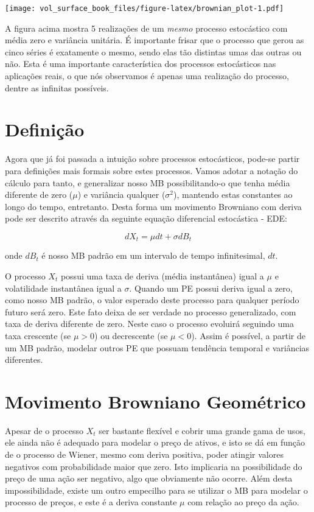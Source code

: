 \documentclass[]{book}
\begin{document}
\texttt{[image: vol\_surface\_book\_files/figure-latex/brownian\_plot-1.pdf]}

A figura acima mostra 5 realizações de um \emph{mesmo} processo
estocástico com média zero e variância unitária. É importante frisar que
o processo que gerou as cinco séries é exatamente o mesmo, sendo elas
tão distintas umas das outras ou não. Esta é uma importante
característica dos processos estocásticos nas aplicações reais, o que
nós observamos é apenas uma realização do processo, dentre as infinitas
possíveis.

\section{Definição}\label{definicao}

Agora que já foi passada a intuição sobre processos estocásticos,
pode-se partir para definições mais formais sobre estes processos. Vamos
adotar a notação do cálculo para tanto, e generalizar nosso MB
possibilitando-o que tenha média diferente de zero (\(\mu\)) e variância
qualquer (\(\sigma^2\)), mantendo estas constantes ao longo do tempo,
entretanto. Desta forma um movimento Browniano com deriva pode ser
descrito através da seguinte equação diferencial estocástica - EDE:

\begin{equation}
dX_t = \mu dt + \sigma dB_t
\label{eq:mb}
\end{equation}

onde \(dB_t\) é nosso MB padrão em um intervalo de tempo infinitesimal,
\(dt\).

O processo \(X_t\) possui uma taxa de deriva (média instantânea) igual a
\(\mu\) e volatilidade instantânea igual a \(\sigma\). Quando um PE
possui deriva igual a zero, como nosso MB padrão, o valor esperado deste
processo para qualquer período futuro será zero. Este fato deixa de ser
verdade no processo generalizado, com taxa de deriva diferente de zero.
Neste caso o processo evoluirá seguindo uma taxa crescente (se
\(\mu > 0\)) ou decrescente (se \(\mu < 0\)). Assim é possível, a partir
de um MB padrão, modelar outros PE que possuam tendência temporal e
variâncias diferentes.

\section{Movimento Browniano Geométrico}\label{mbg}

Apesar de o processo \(X_t\) ser bastante flexível e cobrir uma grande
gama de usos, ele ainda não é adequado para modelar o preço de ativos, e
isto se dá em função de o processo de Wiener, mesmo com deriva positiva,
poder atingir valores negativos com probabilidade maior que zero. Isto
implicaria na possibilidade do preço de uma ação ser negativo, algo que
obviamente não ocorre. Além desta impossibilidade, existe um outro
empecilho para se utilizar o MB para modelar o processo de preços, e
este é a deriva constante \(\mu\) com relação ao preço da ação.
\end{document}
